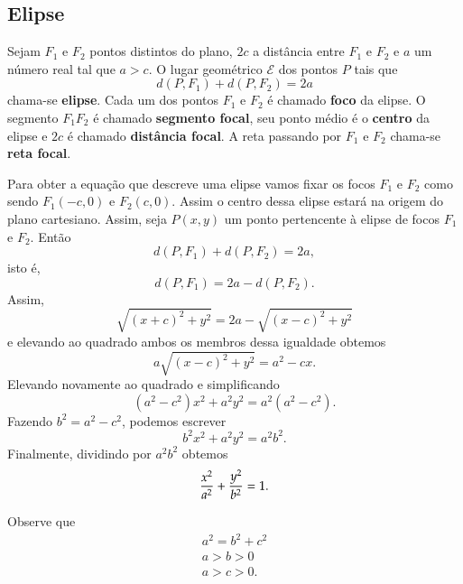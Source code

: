 \subsection{Elipse} %
\label{sub:elipse}

\begin{definicao}
  Sejam $F_1$ e $F_2$ pontos distintos do plano, $2c$ a dist\^ancia entre $F_1$ e $F_2$ e $a$ um n\'umero real tal que $a > c$. O lugar geom\'etrico $\mathcal{E}$ dos pontos $P$ tais que
  \begin{equation}\label{definicaoelipse}
    d(P,F_1) + d(P,F_2) = 2a
  \end{equation}
  chama-se \textbf{elipse}. Cada um dos pontos $F_1$ e $F_2$ \'e chamado \textbf{foco} da elipse. O segmento $F_1F_2$ \'e chamado \textbf{segmento focal}, seu ponto m\'edio \'e o \textbf{centro} da elipse e $2c$ \'e chamado \textbf{dist\^ancia focal}. A reta passando por $F_1$ e $F_2$ chama-se \textbf{reta focal}.   
\end{definicao}

Para obter a equa\c{c}\~ao que descreve uma elipse vamos fixar os focos $F_1$ e $F_2$ como sendo $F_1(-c,0)$ e $F_2(c,0)$. Assim o centro dessa elipse estar\'a na origem do plano cartesiano. Assim, seja $P(x,y)$ um ponto pertencente \`a elipse de focos $F_1$ e $F_2$. Ent\~ao
\begin{equation}
  d(P,F_1) + d(P,F_2) = 2a,
\end{equation}
isto \'e,
\begin{equation}
  d(P,F_1) = 2a -  d(P,F_2).
\end{equation}
Assim,
\[
  \sqrt{(x + c)^2 + y^2} = 2a - \sqrt{(x - c)^2 + y^2}
\]
e elevando ao quadrado ambos os membros dessa igualdade obtemos
\[
  a\sqrt{(x - c)^2 + y^2} = a^2 - cx.
\]
Elevando novamente ao quadrado e simplificando
\[
  (a^2 - c^2)x^2 + a^2y^2 = a^2(a^2 - c^2).
\]
Fazendo $b^2 = a^2 - c^2$, podemos escrever
\[
  b^2x^2 + a^2y^2 = a^2b^2.
\]
Finalmente, dividindo por $a^2b^2$ obtemos
\begin{equation}\label{equacaoelipse}
  \dfrac{x^2}{a^2} + \dfrac{y^2}{b^2} = 1.
\end{equation}

Observe que
\begin{align}
  a^2 = b^2 + c^2\\
  a > b > 0\\
  a > c > 0.
\end{align}


